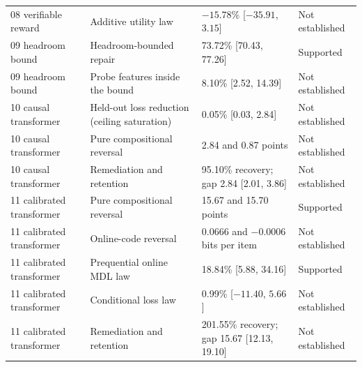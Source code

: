 \begin{table}[t]
\begin{tabular}{@{}p{}p{}p{}p{}@{}}
08 verifiable reward & Additive utility law & $-15.78\%$ [$-35.91$, $3.15$] & Not established \\
09 headroom bound & Headroom-bounded repair & 73.72\% [70.43, 77.26] & Supported \\
09 headroom bound & Probe features inside the bound & 8.10\% [2.52, 14.39] & Not established \\
10 causal transformer & Held-out loss reduction (ceiling saturation) & 0.05\% [0.03, 2.84] & Not established \\
10 causal transformer & Pure compositional reversal & 2.84 and 0.87 points & Not established \\
10 causal transformer & Remediation and retention & 95.10\% recovery; gap 2.84 [2.01, 3.86] & Not established \\
11 calibrated transformer & Pure compositional reversal & 15.67 and 15.70 points & Supported \\
11 calibrated transformer & Online-code reversal & 0.0666 and $-0.0006$ bits per item & Not established \\
11 calibrated transformer & Prequential online MDL law & 18.84\% [5.88, 34.16] & Supported \\
11 calibrated transformer & Conditional loss law & 0.99\% [$-11.40$, $5.66$] & Not established \\
11 calibrated transformer & Remediation and retention & 201.55\% recovery; gap 15.67 [12.13, 19.10] & Not established \\
\bottomrule
\end{tabular}
\end{table}
